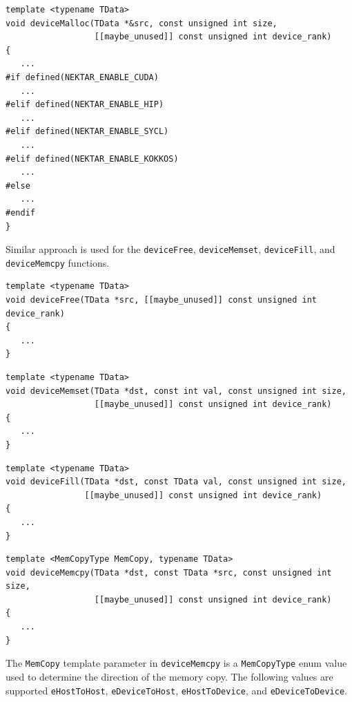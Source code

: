 \begin{lstlisting}[style=C++Style]
template <typename TData>
void deviceMalloc(TData *&src, const unsigned int size,
                  [[maybe_unused]] const unsigned int device_rank)
{
   ...
#if defined(NEKTAR_ENABLE_CUDA)
   ...
#elif defined(NEKTAR_ENABLE_HIP)
   ...
#elif defined(NEKTAR_ENABLE_SYCL)
   ...
#elif defined(NEKTAR_ENABLE_KOKKOS)
   ...
#else
   ...
#endif
}
\end{lstlisting}

Similar approach is used for the \lstinline[style=C++Style]!deviceFree!, \lstinline[style=C++Style]!deviceMemset!, \lstinline[style=C++Style]!deviceFill!, and \lstinline[style=C++Style]!deviceMemcpy! functions.
\begin{lstlisting}[style=C++Style]
template <typename TData>
void deviceFree(TData *src, [[maybe_unused]] const unsigned int device_rank)
{
   ...
}
\end{lstlisting}

\begin{lstlisting}[style=C++Style]
template <typename TData>
void deviceMemset(TData *dst, const int val, const unsigned int size,
                  [[maybe_unused]] const unsigned int device_rank)
{
   ...
}
\end{lstlisting}

\begin{lstlisting}[style=C++Style]
template <typename TData>
void deviceFill(TData *dst, const TData val, const unsigned int size,
                [[maybe_unused]] const unsigned int device_rank)
{
   ...
}
\end{lstlisting}

\begin{lstlisting}[style=C++Style]
template <MemCopyType MemCopy, typename TData>
void deviceMemcpy(TData *dst, const TData *src, const unsigned int size,
                  [[maybe_unused]] const unsigned int device_rank)
{
   ...
}
\end{lstlisting}

The \lstinline[style=C++Style]!MemCopy! template parameter in \lstinline[style=C++Style]!deviceMemcpy! is a \lstinline[style=C++Style]!MemCopyType! enum value used to determine the direction of the memory copy. The following values are supported \lstinline[style=C++Style]!eHostToHost!, \lstinline[style=C++Style]!eDeviceToHost!, \lstinline[style=C++Style]!eHostToDevice!, and \lstinline[style=C++Style]!eDeviceToDevice!.


